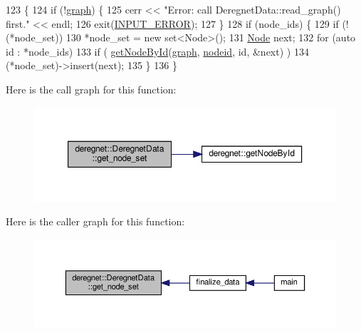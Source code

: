 \begin{DoxyCode}
123                                                                    \{
124     \textcolor{keywordflow}{if} (!\hyperlink{classderegnet_1_1DeregnetData_ab76d30fa2ef87099faecb31e3f95b6d6}{graph}) \{
125         cerr << \textcolor{stringliteral}{"Error: call DeregnetData::read\_graph() first."} << endl;
126         exit(\hyperlink{DeregnetData_8hpp_a288116f92845fddefeb044f5b84bc889}{INPUT\_ERROR});
127     \}
128     \textcolor{keywordflow}{if} (node\_ids) \{
129         \textcolor{keywordflow}{if} (!(*node\_set))
130             *node\_set = \textcolor{keyword}{new} set<Node>();
131         \hyperlink{namespacederegnet_a744bad34f2de9856d36715a445f027f3}{Node} next;
132         \textcolor{keywordflow}{for} (\textcolor{keyword}{auto} \textcolor{keywordtype}{id} : *node\_ids)
133             \textcolor{keywordflow}{if} ( \hyperlink{namespacederegnet_afefc9088a0ea47e8d8c1225b5de29244}{getNodeById}(\hyperlink{classderegnet_1_1DeregnetData_ab76d30fa2ef87099faecb31e3f95b6d6}{graph}, \hyperlink{classderegnet_1_1DeregnetData_a3b57d7ed19c104c7fe257e17f0d2cfb5}{nodeid}, \textcolor{keywordtype}{id}, &next) )
134                 (*node\_set)->insert(next);
135     \}
136 \}
\end{DoxyCode}
Here is the call graph for this function\+:\nopagebreak
\begin{figure}[H]
\begin{center}
\leavevmode
\includegraphics[width=350pt]{classderegnet_1_1DeregnetData_a7d662c0dd84d814bbaaf56718a99306a_cgraph}
\end{center}
\end{figure}
Here is the caller graph for this function\+:\nopagebreak
\begin{figure}[H]
\begin{center}
\leavevmode
\includegraphics[width=350pt]{classderegnet_1_1DeregnetData_a7d662c0dd84d814bbaaf56718a99306a_icgraph}
\end{center}
\end{figure}
\mbox{\label{classderegnet_1_1DeregnetData_aaef262d5ca460f10851b25c01ad2f9bc}} 
